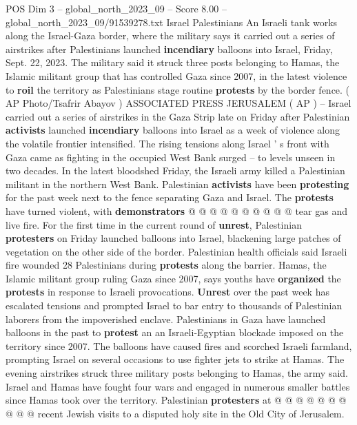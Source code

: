 \begin{textsample}{POS Dim 3 – global\_north\_2023\_09 – Score 8.00 – global\_north\_2023\_09/91539278.txt}  \label{ex:f3_pos_062}
Israel Palestinians An Israeli tank works along the Israel-Gaza border, where the military says it carried out a series of airstrikes after Palestinians launched \textbf{incendiary} balloons into Israel, Friday, Sept. 22, 2023.
The military said it struck three posts belonging to Hamas, the Islamic militant group that has controlled Gaza since 2007, in the latest violence to \textbf{roil} the territory as Palestinians stage routine \textbf{protests} by the border fence. ( AP Photo/Tsafrir Abayov ) ASSOCIATED PRESS JERUSALEM ( AP ) -- Israel carried out a series of airstrikes in the Gaza Strip late on Friday after Palestinian \textbf{activists} launched \textbf{incendiary} balloons into Israel as a week of violence along the volatile frontier intensified.
The rising tensions along Israel ' s front with Gaza came as fighting in the occupied West Bank surged -- to levels unseen in two decades.
In the latest bloodshed Friday, the Israeli army killed a Palestinian militant in the northern West Bank.
Palestinian \textbf{activists} have been \textbf{protesting} for the past week next to the fence separating Gaza and Israel.
The \textbf{protests} have turned violent, with \textbf{demonstrators} @ @ @ @ @ @ @ @ @ @ tear gas and live fire.
For the first time in the current round of \textbf{unrest}, Palestinian \textbf{protesters} on Friday launched balloons into Israel, blackening large patches of vegetation on the other side of the border.
Palestinian health officials said Israeli fire wounded 28 Palestinians during \textbf{protests} along the barrier.
Hamas, the Islamic militant group ruling Gaza since 2007, says youths have \textbf{organized} the \textbf{protests} in response to Israeli provocations. \textbf{Unrest} over the past week has escalated tensions and prompted Israel to bar entry to thousands of Palestinian laborers from the impoverished enclave.
Palestinians in Gaza have launched balloons in the past to \textbf{protest} an an Israeli-Egyptian blockade imposed on the territory since 2007.
The balloons have caused fires and scorched Israeli farmland, prompting Israel on several occasions to use fighter jets to strike at Hamas.
The evening airstrikes struck three military posts belonging to Hamas, the army said.
Israel and Hamas have fought four wars and engaged in numerous smaller battles since Hamas took over the territory.
Palestinian \textbf{protesters} at @ @ @ @ @ @ @ @ @ @ recent Jewish visits to a disputed holy site in the Old City of Jerusalem.

\end{textsample}
